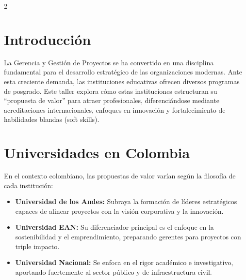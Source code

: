 \documentclass[10pt,a4paper]{article}
\begin{document}
	\begin{multicols}{2}
		\section{Introducción}
			La Gerencia y Gestión de Proyectos se ha convertido en una disciplina fundamental para el desarrollo estratégico de las organizaciones modernas. Ante esta creciente demanda, las instituciones educativas ofrecen diversos programas de posgrado. Este taller explora cómo estas instituciones estructuran su ``propuesta de valor'' para atraer profesionales, diferenciándose mediante acreditaciones internacionales, enfoques en innovación y fortalecimiento de habilidades blandas (soft skills).
			
		\section{Universidades en Colombia}
			En el contexto colombiano, las propuestas de valor varían según la filosofía de cada institución:
			\begin{itemize}
			    \item \textbf{Universidad de los Andes:} Subraya la formación de líderes estratégicos capaces de alinear proyectos con la visión corporativa y la innovación.
			    \item \textbf{Universidad EAN:} Su diferenciador principal es el enfoque en la sostenibilidad y el emprendimiento, preparando gerentes para proyectos con triple impacto.
			    \item \textbf{Universidad Nacional:} Se enfoca en el rigor académico e investigativo, aportando fuertemente al sector público y de infraestructura civil.
			\end{itemize}
	\end{multicols}
	
\end{document}
